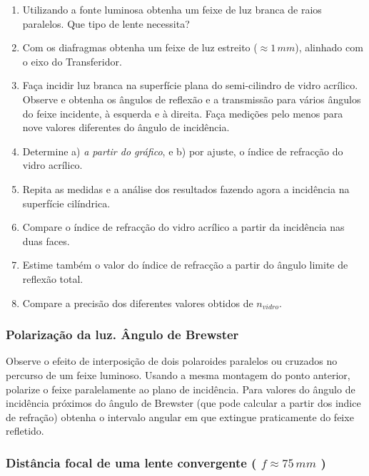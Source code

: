 \documentclass[a4paper,12pt]{article}      %
\begin{document}
\begin{enumerate}
\item Utilizando a  fonte  luminosa  obtenha  um  feixe  de  luz  branca  de  raios  paralelos. Que tipo de lente necessita?
\item Com os diafragmas obtenha um feixe de luz estreito ($\approx 1\,mm$), alinhado com o eixo do Transferidor.
\item Faça  incidir  luz  branca  na  superfície  plana  do  semi-cilindro  de  vidro  acrílico.  Observe  e obtenha os ângulos de 
reflexão e a transmissão para vários ângulos do feixe incidente, à 
esquerda e à direita.  Faça  medições  pelo  menos  para  nove  valores  diferentes  do 
ângulo de incidência.
\item  Determine a) \emph{a partir do gráfico}, e b) por ajuste, o índice de refracção do vidro acrílico.  
\item Repita  as  medidas  e  a  análise  dos  resultados  fazendo  agora  a  incidência  na  superfície cilíndrica. 
\item  Compare o índice de refracção do vidro acrílico a partir da incidência nas duas faces. 
\item Estime também o valor do índice de refracção a partir do ângulo limite de reflexão total. 
\item  Compare a precisão dos diferentes valores obtidos de $n_{vidro}$. 
\end{enumerate}
	
\subsubsection{\sf Polarização da luz. Ângulo de Brewster}
Observe o efeito de interposição de dois polaroides paralelos ou cruzados no percurso de um feixe luminoso. 
Usando a mesma montagem do ponto anterior, polarize o feixe  paralelamente ao plano
de incidência. Para valores do ângulo de incidência próximos 
do  ângulo  de  Brewster  (que  pode  calcular  a  partir  dos  indice de refração) obtenha   o  intervalo 
angular em que extingue praticamente  do feixe refletido. 

\subsubsection{\sf   Distância focal de uma lente convergente ( $f  \approx 75\, mm$ ) }
 
\end{document}
